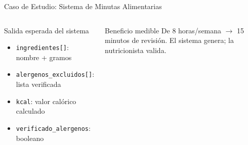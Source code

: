 \documentclass[aspectratio=169]{beamer}
\begin{document}
\begin{frame}{Caso de Estudio: Sistema de Minutas Alimentarias}
\begin{columns}
\begin{exampleblock}{Salida esperada del sistema}
\begin{itemize}
        \item \texttt{ingredientes[]}: nombre + gramos
        \item \texttt{alergenos\_excluidos[]}: lista verificada
        \item \texttt{kcal}: valor calórico calculado
        \item \texttt{verificado\_alergenos}: booleano
      \end{itemize}
    \end{exampleblock}
    \vspace{0.3em}
    \begin{block}{Beneficio medible}
      \scriptsize
      De 8 horas/semana $\longrightarrow$ 15 minutos de revisión.
      El sistema genera; la nutricionista valida.
    \end{block}
  \end{columns}
\end{frame}
\end{document}
